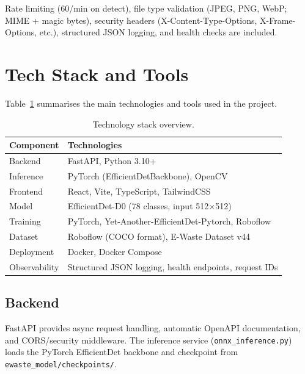\documentclass[11pt,a4paper]{article}
\begin{document}
Rate limiting (60/min on detect), file type validation (JPEG, PNG, WebP; MIME + magic bytes), security headers (X-Content-Type-Options, X-Frame-Options, etc.), structured JSON logging, and health checks are included.

\section{Tech Stack and Tools}
\label{sec:techstack}

Table~\ref{tab:techstack} summarises the main technologies and tools used in the project.

\begin{table}[htbp]
    \centering
    \caption{Technology stack overview.}
    \label{tab:techstack}
    \begin{tabular}{@{}ll@{}}
        \toprule
        \textbf{Component} & \textbf{Technologies} \\
        \midrule
        Backend & FastAPI, Python 3.10+ \\
        Inference & PyTorch (EfficientDetBackbone), OpenCV \\
        Frontend & React, Vite, TypeScript, TailwindCSS \\
        Model & EfficientDet-D0 (78 classes, input 512$\times$512) \\
        Training & PyTorch, Yet-Another-EfficientDet-Pytorch, Roboflow \\
        Dataset & Roboflow (COCO format), E-Waste Dataset v44 \\
        Deployment & Docker, Docker Compose \\
        Observability & Structured JSON logging, health endpoints, request IDs \\
        \bottomrule
    \end{tabular}
\end{table}

\subsection{Backend}

FastAPI provides async request handling, automatic OpenAPI documentation, and CORS/security middleware. The inference service (\texttt{onnx\_inference.py}) loads the PyTorch EfficientDet backbone and checkpoint from \texttt{ewaste\_model/checkpoints/}.
\end{document}
